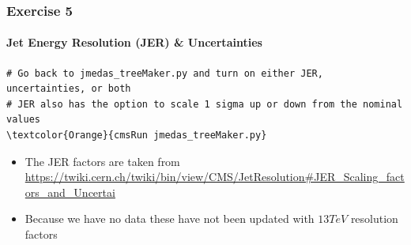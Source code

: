 \begin{frame}[fragile]
	\frametitle{Exercise 5}
	\framesubtitle{Jet Energy Resolution (JER) \& Uncertainties}

\begin{Verbatim}[label={Exercise 5}]
# Go back to jmedas_treeMaker.py and turn on either JER, uncertainties, or both
# JER also has the option to scale 1 sigma up or down from the nominal values
\textcolor{Orange}{cmsRun jmedas_treeMaker.py}
\end{Verbatim}

\begin{block}{}
	\begin{itemize}
		\item The JER factors are taken from \href{https://twiki.cern.ch/twiki/bin/view/CMS/JetResolution#JER_Scaling_factors_and_Uncertai}{https://twiki.cern.ch/twiki/bin/view/CMS/JetResolution\#JER\_Scaling\_factors\_and\_Uncertai}
		\item Because we have no data these have not been updated with $13\unit{TeV}$ resolution factors
	\end{itemize}
\end{block}

\end{frame}




